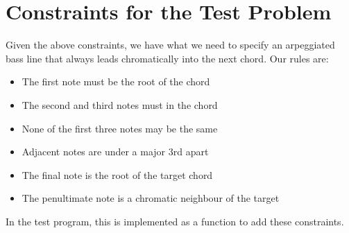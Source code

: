 \documentclass[letterpaper,10pt,english]{sphinxmanual}
\begin{document}
\chapter{Constraints for the Test Problem}
\label{\detokenize{index:constraints-for-the-test-problem}}
\sphinxAtStartPar
Given the above constraints, we have what we need to specify an arpeggiated bass line
that always leads chromatically into the next chord.
Our rules are:
\begin{itemize}
\item {} 
\sphinxAtStartPar
The first note must be the root of the chord

\item {} 
\sphinxAtStartPar
The second and third notes must in the chord

\item {} 
\sphinxAtStartPar
None of the first three notes may be the same

\item {} 
\sphinxAtStartPar
Adjacent notes are under a major 3rd apart

\item {} 
\sphinxAtStartPar
The final note is the root of the target chord

\item {} 
\sphinxAtStartPar
The penultimate note is a chromatic neighbour of the target

\end{itemize}

\sphinxAtStartPar
In the test program, this is implemented as a function to add these constraints.
\end{document}
